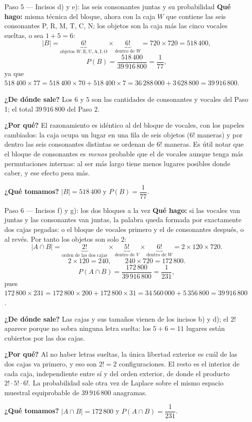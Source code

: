 \documentclass[11pt]{article}
\begin{document}
\begin{paso}{Paso 5 --- Incisos d) y e): las seis consonantes juntas y su probabilidad}
\textbf{Qué hago:} misma técnica del bloque, ahora con la caja $W$ que contiene las seis consonantes P, R,
M, T, C, N; los objetos son la caja más las cinco vocales sueltas, o sea $1+5=6$:
\[
|B|=\underbrace{6!}_{\text{objetos } W,\text{E},\text{U},\text{A},\text{I},\text{O}}\times\underbrace{6!}_{\text{dentro de }W}
=720\times720=518\,400 ,
\]
\[
P(B)=\frac{518\,400}{39\,916\,800}=\frac{1}{77},
\]
ya que $518\,400\times77=518\,400\times70+518\,400\times7=36\,288\,000+3\,628\,800=39\,916\,800$.

\textbf{¿De dónde sale?} Los $6$ y $5$ son las cantidades de consonantes y vocales del Paso 1; el total
$39\,916\,800$ del Paso 2.

\textbf{¿Por qué?} El razonamiento es idéntico al del bloque de vocales, con los papeles cambiados: la caja
ocupa un lugar en una fila de seis objetos ($6!$ maneras) y por dentro las seis consonantes distintas se
ordenan de $6!$ maneras. Es útil notar que el bloque de consonantes es \emph{menos} probable que el de
vocales aunque tenga más permutaciones internas: al ser más largo tiene menos lugares posibles donde
caber, y ese efecto pesa más.

\textbf{¿Qué tomamos?} $|B|=518\,400$ y $P(B)=\dfrac{1}{77}$.
\end{paso}

\begin{paso}{Paso 6 --- Incisos f) y g): los dos bloques a la vez}
\textbf{Qué hago:} si las vocales van juntas y las consonantes van juntas, la palabra queda formada por
exactamente dos cajas pegadas: o el bloque de vocales primero y el de consonantes después, o al revés. Por
tanto los objetos son solo $2$:
\[
|A\cap B|=\underbrace{2!}_{\text{orden de las dos cajas}}\times\underbrace{5!}_{\text{dentro de }V}\times\underbrace{6!}_{\text{dentro de }W}
=2\times120\times720 .
\]
\[
2\times120=240,\qquad 240\times720=172\,800 .
\]
\[
P(A\cap B)=\frac{172\,800}{39\,916\,800}=\frac{1}{231},
\]
pues $172\,800\times231=172\,800\times200+172\,800\times31=34\,560\,000+5\,356\,800=39\,916\,800$.

\textbf{¿De dónde sale?} Las cajas y sus tamaños vienen de los incisos b) y d); el $2!$ aparece porque no
sobra ninguna letra suelta: los $5+6=11$ lugares están cubiertos por las dos cajas.

\textbf{¿Por qué?} Al no haber letras sueltas, la única libertad exterior es cuál de las dos cajas va
primero, y eso son $2!=2$ configuraciones. El resto es el interior de cada caja, independiente entre sí y
del orden exterior, de donde el producto $2!\cdot5!\cdot6!$. La probabilidad sale otra vez de Laplace
sobre el mismo espacio muestral equiprobable de $39\,916\,800$ anagramas.

\textbf{¿Qué tomamos?} $|A\cap B|=172\,800$ y $P(A\cap B)=\dfrac{1}{231}$.
\end{paso}
\end{document}
